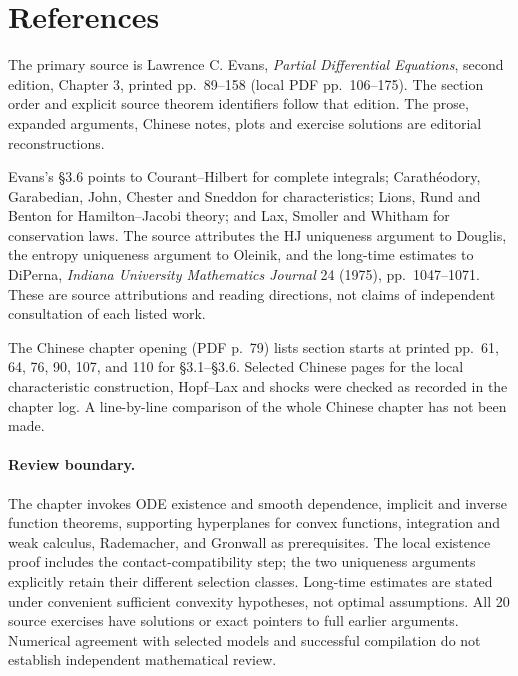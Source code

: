 \Needspace{65mm}
\section{References}
\label{sec:3-6}

The primary source is Lawrence C. Evans, \emph{Partial Differential
Equations}, second edition, Chapter 3, printed pp.~89--158
(local PDF pp.~106--175). The section order and explicit source
theorem identifiers follow that edition. The prose, expanded arguments,
Chinese notes, plots and exercise solutions are editorial reconstructions.

Evans's \S3.6 points to Courant--Hilbert for complete integrals;
Carath\'eodory, Garabedian, John, Chester and Sneddon for characteristics;
Lions, Rund and Benton for Hamilton--Jacobi theory; and Lax, Smoller
and Whitham for conservation laws.
The source attributes the HJ uniqueness argument to Douglis, the
entropy uniqueness argument to Oleinik, and the long-time estimates
to DiPerna, \emph{Indiana University Mathematics Journal} 24 (1975),
pp.~1047--1071.
These are source attributions and reading directions, not claims of
independent consultation of each listed work.

The Chinese chapter opening (PDF p.~79) lists section starts at printed
pp.~61, 64, 76, 90, 107, and 110 for \S3.1--\S3.6.
Selected Chinese pages for the local characteristic construction,
Hopf--Lax and shocks were checked as recorded in the chapter log.
A line-by-line comparison of the whole Chinese chapter has not been made.

\paragraph{Review boundary.}
The chapter invokes ODE existence and smooth dependence, implicit and
inverse function theorems, supporting hyperplanes for convex functions,
integration and weak calculus, Rademacher, and Gronwall as prerequisites.
The local existence proof includes the contact-compatibility step;
the two uniqueness arguments explicitly retain their different
selection classes. Long-time estimates are stated under convenient
sufficient convexity hypotheses, not optimal assumptions.
All 20 source exercises have solutions or exact pointers to full earlier
arguments. Numerical agreement with selected models and successful
compilation do not establish independent mathematical review.
